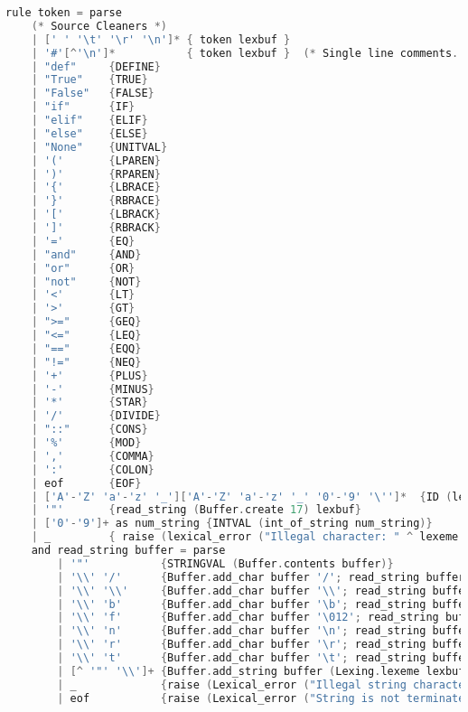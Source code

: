 \documentclass{l4proj}
\begin{document}
\begin{appendices}
\begin{lstlisting}[language=C, label=lst:lexer-spec, caption=PyFunc's lexer specification for OCamllex., keepspaces=true]
rule token = parse
    (* Source Cleaners *)
    | [' ' '\t' '\r' '\n']* { token lexbuf }
    | '#'[^'\n']*           { token lexbuf }  (* Single line comments. *)
    | "def"     {DEFINE}
    | "True"    {TRUE}
    | "False"   {FALSE}
    | "if"      {IF}
    | "elif"    {ELIF}
    | "else"    {ELSE}
    | "None"    {UNITVAL}
    | '('       {LPAREN}
    | ')'       {RPAREN}
    | '{'       {LBRACE}
    | '}'       {RBRACE}
    | '['       {LBRACK}
    | ']'       {RBRACK}
    | '='       {EQ}
    | "and"     {AND}
    | "or"      {OR}
    | "not"     {NOT}
    | '<'       {LT}
    | '>'       {GT}
    | ">="      {GEQ}
    | "<="      {LEQ}
    | "=="      {EQQ}
    | "!="      {NEQ}
    | '+'       {PLUS}
    | '-'       {MINUS}
    | '*'       {STAR}
    | '/'       {DIVIDE}
    | "::"      {CONS}
    | '%'       {MOD}
    | ','       {COMMA}
    | ':'       {COLON}
    | eof       {EOF}
    | ['A'-'Z' 'a'-'z' '_']['A'-'Z' 'a'-'z' '_' '0'-'9' '\'']*  {ID (lexeme lexbuf)}
    | '"'       {read_string (Buffer.create 17) lexbuf}
    | ['0'-'9']+ as num_string {INTVAL (int_of_string num_string)}
    | _         { raise (lexical_error ("Illegal character: " ^ lexeme lexbuf))}
    and read_string buffer = parse
        | '"'           {STRINGVAL (Buffer.contents buffer)}
        | '\\' '/'      {Buffer.add_char buffer '/'; read_string buffer lexbuf}
        | '\\' '\\'     {Buffer.add_char buffer '\\'; read_string buffer lexbuf}
        | '\\' 'b'      {Buffer.add_char buffer '\b'; read_string buffer lexbuf}
        | '\\' 'f'      {Buffer.add_char buffer '\012'; read_string buffer lexbuf}
        | '\\' 'n'      {Buffer.add_char buffer '\n'; read_string buffer lexbuf}
        | '\\' 'r'      {Buffer.add_char buffer '\r'; read_string buffer lexbuf}
        | '\\' 't'      {Buffer.add_char buffer '\t'; read_string buffer lexbuf}
        | [^ '"' '\\']+ {Buffer.add_string buffer (Lexing.lexeme lexbuf);read_string buffer lexbuf}
        | _             {raise (Lexical_error ("Illegal string character: " ^ Lexing.lexeme lexbuf))}
        | eof           {raise (Lexical_error ("String is not terminated"))}
\end{lstlisting}


\end{appendices}
\end{document}
